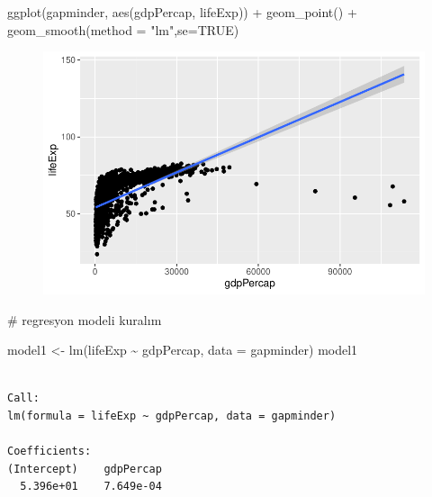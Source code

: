 \documentclass[
  letterpaper,
  DIV=11,
  numbers=noendperiod]{scrreprt}
\newenvironment{Shaded}{\begin{snugshade}}{\end{snugshade}}
\newcommand{\AttributeTok}[1]{\textcolor[rgb]{0.40,0.45,0.13}{#1}}
\newcommand{\CommentTok}[1]{\textcolor[rgb]{0.37,0.37,0.37}{#1}}
\newcommand{\ConstantTok}[1]{\textcolor[rgb]{0.56,0.35,0.01}{#1}}
\newcommand{\FunctionTok}[1]{\textcolor[rgb]{0.28,0.35,0.67}{#1}}
\newcommand{\NormalTok}[1]{\textcolor[rgb]{0.00,0.23,0.31}{#1}}
\newcommand{\OtherTok}[1]{\textcolor[rgb]{0.00,0.23,0.31}{#1}}
\newcommand{\SpecialCharTok}[1]{\textcolor[rgb]{0.37,0.37,0.37}{#1}}
\newcommand{\StringTok}[1]{\textcolor[rgb]{0.13,0.47,0.30}{#1}}
\begin{document}
\begin{Shaded}
\begin{Highlighting}[]
\FunctionTok{ggplot}\NormalTok{(gapminder, }\FunctionTok{aes}\NormalTok{(gdpPercap, lifeExp)) }\SpecialCharTok{+}
  \FunctionTok{geom\_point}\NormalTok{() }\SpecialCharTok{+} 
  \FunctionTok{geom\_smooth}\NormalTok{(}\AttributeTok{method =} \StringTok{"lm"}\NormalTok{,}\AttributeTok{se=}\ConstantTok{TRUE}\NormalTok{)}
\end{Highlighting}
\end{Shaded}

\begin{figure}[H]

{\centering \includegraphics{regresyon_files/figure-pdf/unnamed-chunk-1-2.pdf}

}

\end{figure}

\begin{Shaded}
\begin{Highlighting}[]
\CommentTok{\# regresyon modeli kuralım}

\NormalTok{model1 }\OtherTok{\textless{}{-}} \FunctionTok{lm}\NormalTok{(lifeExp }\SpecialCharTok{\textasciitilde{}}\NormalTok{ gdpPercap, }\AttributeTok{data =}\NormalTok{ gapminder)}
\NormalTok{model1}
\end{Highlighting}
\end{Shaded}

\begin{verbatim}

Call:
lm(formula = lifeExp ~ gdpPercap, data = gapminder)

Coefficients:
(Intercept)    gdpPercap  
  5.396e+01    7.649e-04  
\end{verbatim}
\end{document}
